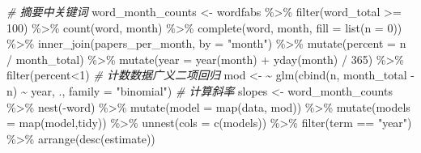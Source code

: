\documentclass[]{tufte-book}
\newenvironment{Shaded}{}{}
\newcommand{\AttributeTok}[1]{\textcolor[rgb]{0.49,0.56,0.16}{#1}}
\newcommand{\CommentTok}[1]{\textcolor[rgb]{0.38,0.63,0.69}{\textit{#1}}}
\newcommand{\DecValTok}[1]{\textcolor[rgb]{0.25,0.63,0.44}{#1}}
\newcommand{\ErrorTok}[1]{\textcolor[rgb]{1.00,0.00,0.00}{\textbf{#1}}}
\newcommand{\FunctionTok}[1]{\textcolor[rgb]{0.02,0.16,0.49}{#1}}
\newcommand{\NormalTok}[1]{#1}
\newcommand{\OtherTok}[1]{\textcolor[rgb]{0.00,0.44,0.13}{#1}}
\newcommand{\SpecialCharTok}[1]{\textcolor[rgb]{0.25,0.44,0.63}{#1}}
\newcommand{\StringTok}[1]{\textcolor[rgb]{0.25,0.44,0.63}{#1}}
\begin{document}
\begin{Shaded}
\begin{Highlighting}[]
\CommentTok{\# 摘要中关键词}
\NormalTok{word\_month\_counts }\OtherTok{\textless{}{-}}\NormalTok{ wordfabs }\SpecialCharTok{\%\textgreater{}\%}
  \FunctionTok{filter}\NormalTok{(word\_total }\SpecialCharTok{\textgreater{}=} \DecValTok{100}\NormalTok{) }\SpecialCharTok{\%\textgreater{}\%}
  \FunctionTok{count}\NormalTok{(word, month) }\SpecialCharTok{\%\textgreater{}\%}
  \FunctionTok{complete}\NormalTok{(word, month, }\AttributeTok{fill =} \FunctionTok{list}\NormalTok{(}\AttributeTok{n =} \DecValTok{0}\NormalTok{)) }\SpecialCharTok{\%\textgreater{}\%}
  \FunctionTok{inner\_join}\NormalTok{(papers\_per\_month, }\AttributeTok{by =} \StringTok{"month"}\NormalTok{) }\SpecialCharTok{\%\textgreater{}\%}
  \FunctionTok{mutate}\NormalTok{(}\AttributeTok{percent =}\NormalTok{ n }\SpecialCharTok{/}\NormalTok{ month\_total) }\SpecialCharTok{\%\textgreater{}\%}
  \FunctionTok{mutate}\NormalTok{(}\AttributeTok{year =} \FunctionTok{year}\NormalTok{(month) }\SpecialCharTok{+} \FunctionTok{yday}\NormalTok{(month) }\SpecialCharTok{/} \DecValTok{365}\NormalTok{) }\SpecialCharTok{\%\textgreater{}\%}
        \FunctionTok{filter}\NormalTok{(percent}\SpecialCharTok{\textless{}}\DecValTok{1}\NormalTok{)}
\CommentTok{\# 计数数据广义二项回归}
\NormalTok{mod }\OtherTok{\textless{}{-}} \ErrorTok{\textasciitilde{}} \FunctionTok{glm}\NormalTok{(}\FunctionTok{cbind}\NormalTok{(n, month\_total }\SpecialCharTok{{-}}\NormalTok{ n) }\SpecialCharTok{\textasciitilde{}}\NormalTok{ year, ., }\AttributeTok{family =} \StringTok{"binomial"}\NormalTok{)}
\CommentTok{\# 计算斜率}
\NormalTok{slopes }\OtherTok{\textless{}{-}}\NormalTok{ word\_month\_counts }\SpecialCharTok{\%\textgreater{}\%}
  \FunctionTok{nest}\NormalTok{(}\SpecialCharTok{{-}}\NormalTok{word) }\SpecialCharTok{\%\textgreater{}\%}
  \FunctionTok{mutate}\NormalTok{(}\AttributeTok{model =} \FunctionTok{map}\NormalTok{(data, mod)) }\SpecialCharTok{\%\textgreater{}\%}
  \FunctionTok{mutate}\NormalTok{(}\AttributeTok{models =} \FunctionTok{map}\NormalTok{(model,tidy)) }\SpecialCharTok{\%\textgreater{}\%}
  \FunctionTok{unnest}\NormalTok{(}\AttributeTok{cols =} \FunctionTok{c}\NormalTok{(models)) }\SpecialCharTok{\%\textgreater{}\%}
  \FunctionTok{filter}\NormalTok{(term }\SpecialCharTok{==} \StringTok{"year"}\NormalTok{) }\SpecialCharTok{\%\textgreater{}\%}
  \FunctionTok{arrange}\NormalTok{(}\FunctionTok{desc}\NormalTok{(estimate))}
\end{Highlighting}
\end{Shaded}
\end{document}
